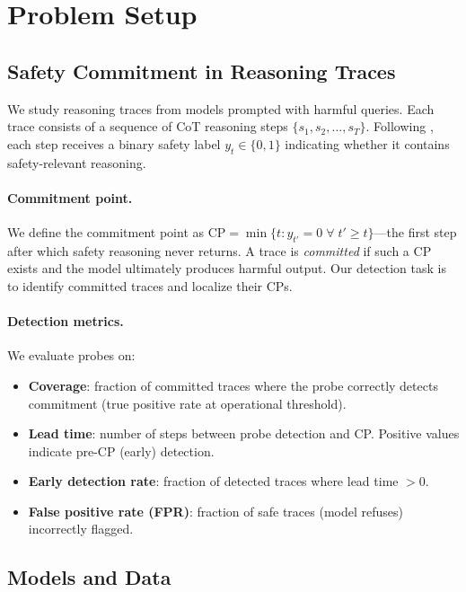 \documentclass[11pt,a4paper]{article}
\begin{document}
\section{Problem Setup}
\label{sec:setup}

\subsection{Safety Commitment in Reasoning Traces}

We study reasoning traces from models prompted with harmful queries. Each trace consists of a sequence of CoT reasoning steps $\{s_1, s_2, \ldots, s_T\}$. Following \citet{jiang2025harmthoughts}, each step receives a binary safety label $y_t \in \{0, 1\}$ indicating whether it contains safety-relevant reasoning.

\paragraph{Commitment point.} We define the commitment point as $\text{CP} = \min\{t : y_{t'} = 0 \;\forall\; t' \geq t\}$---the first step after which safety reasoning never returns. A trace is \emph{committed} if such a CP exists and the model ultimately produces harmful output. Our detection task is to identify committed traces and localize their CPs.

\paragraph{Detection metrics.} We evaluate probes on:
\begin{itemize}
\item \textbf{Coverage}: fraction of committed traces where the probe correctly detects commitment (true positive rate at operational threshold).
\item \textbf{Lead time}: number of steps between probe detection and CP. Positive values indicate pre-CP (early) detection.
\item \textbf{Early detection rate}: fraction of detected traces where lead time $> 0$.
\item \textbf{False positive rate (FPR)}: fraction of safe traces (model refuses) incorrectly flagged.
\end{itemize}

\subsection{Models and Data}
\end{document}
